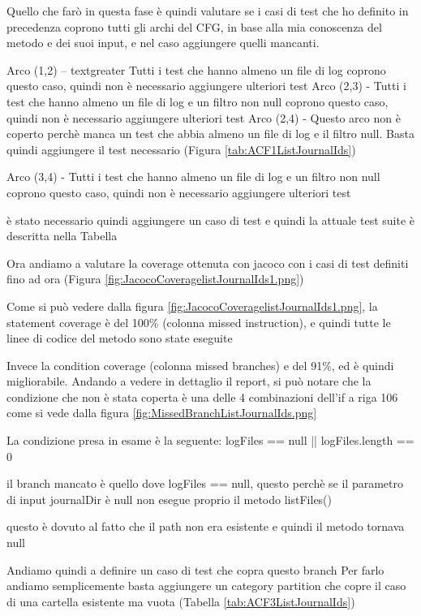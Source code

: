 \documentclass[12pt, a4paper]{article}
\begin{document}
Quello che farò in questa fase è quindi valutare se i casi di test che ho definito in precedenza
coprono tutti gli archi del CFG, in base alla mia conoscenza del metodo e dei suoi input, e nel caso
aggiungere quelli mancanti.


Arco (1,2)  -- textgreater Tutti i test che hanno almeno un file di log coprono questo caso, quindi non è necessario aggiungere ulteriori test
Arco (2,3)  - \> Tutti i test che hanno almeno un file di log e un filtro non null coprono questo caso, quindi non è necessario aggiungere ulteriori test
Arco (2,4)  -\> 
Questo arco non è coperto perchè manca un test che abbia almeno un file di log e il filtro null. Basta quindi aggiungere il 
test necessario (Figura \ref{tab:ACF1ListJournalIds})


Arco (3,4)  -\> Tutti i test che hanno almeno un file di log e un filtro non null coprono questo caso, quindi non è necessario aggiungere ulteriori test


è stato necessario quindi aggiungere un caso di test e quindi la attuale test suite è descritta nella Tabella 


Ora andiamo a valutare la coverage ottenuta con jacoco con i casi di test definiti
fino ad ora (Figura \ref{fig:JacocoCoveragelistJournalIds1.png})

Come si può vedere dalla figura \ref{fig:JacocoCoveragelistJournalIds1.png},
la statement coverage è del 100\% (colonna missed instruction), 
e quindi tutte le linee di codice del metodo sono state eseguite

Invece la condition coverage (colonna missed branches) e del 91\%, ed è quindi migliorabile.
Andando a vedere in dettaglio il report, si può notare che la condizione che non è stata coperta
è una delle 4 combinazioni dell'if a riga 106 come si vede dalla figura \ref{fig:MissedBranchListJournalIds.png}

La condizione presa in esame è la seguente:
logFiles == null || logFiles.length == 0

il branch mancato è quello dove logFiles == null, questo perchè se il parametro di input journalDir è null non esegue proprio il metodo listFiles()


questo è dovuto al fatto che il path non era esistente e quindi il metodo tornava null

Andiamo quindi a definire un caso di test che copra questo branch
Per farlo andiamo semplicemente basta aggiungere un category partition che copre il caso di una cartella esistente ma vuota
(Tabella \ref{tab:ACF3ListJournalIds})
\end{document}
